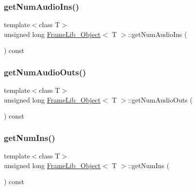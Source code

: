 \subsubsection{\texorpdfstring{get\+Num\+Audio\+Ins()}{getNumAudioIns()}}
{\footnotesize\ttfamily template$<$class T$>$ \\
unsigned long \hyperlink{class_frame_lib___object}{Frame\+Lib\+\_\+\+Object}$<$ T $>$\+::get\+Num\+Audio\+Ins (\begin{DoxyParamCaption}{ }\end{DoxyParamCaption}) const\hspace{0.3cm}{\ttfamily [inline]}}

\mbox{\label{class_frame_lib___object_a430c0531a4c38ad49a556af1cca0af88}} 
\subsubsection{\texorpdfstring{get\+Num\+Audio\+Outs()}{getNumAudioOuts()}}
{\footnotesize\ttfamily template$<$class T$>$ \\
unsigned long \hyperlink{class_frame_lib___object}{Frame\+Lib\+\_\+\+Object}$<$ T $>$\+::get\+Num\+Audio\+Outs (\begin{DoxyParamCaption}{ }\end{DoxyParamCaption}) const\hspace{0.3cm}{\ttfamily [inline]}}

\mbox{\label{class_frame_lib___object_a310416236585b52c2de1c47a9aa64b02}} 
\subsubsection{\texorpdfstring{get\+Num\+Ins()}{getNumIns()}}
{\footnotesize\ttfamily template$<$class T$>$ \\
unsigned long \hyperlink{class_frame_lib___object}{Frame\+Lib\+\_\+\+Object}$<$ T $>$\+::get\+Num\+Ins (\begin{DoxyParamCaption}{ }\end{DoxyParamCaption}) const\hspace{0.3cm}{\ttfamily [inline]}}

